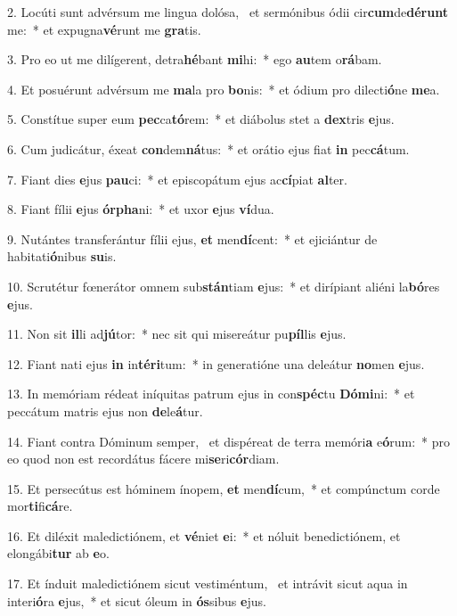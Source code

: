 2. Locúti sunt advérsum me lingua dolósa, \dag\  et sermónibus ódii cir\textbf{cum}de\textbf{dé}\textbf{runt} me:~*  et expugna\textbf{vé}runt me \textbf{gra}tis.\

3. Pro eo ut me dilígerent, detra\textbf{hé}bant \textbf{mi}hi:~*  ego \textbf{au}tem o\textbf{rá}bam.\

4. Et posuérunt advérsum me \textbf{ma}la pro \textbf{bo}nis:~*  et ódium pro dilecti\textbf{ó}ne \textbf{me}a.\

5. Constítue super eum \textbf{pec}ca\textbf{tó}rem:~*  et diábolus stet a \textbf{dex}tris \textbf{e}jus.\

6. Cum judicátur, éxeat \textbf{con}dem\textbf{ná}tus:~*  et orátio ejus fiat \textbf{in} pec\textbf{cá}tum.\

7. Fiant dies \textbf{e}jus \textbf{pau}ci:~*  et episcopátum ejus ac\textbf{cí}piat \textbf{al}ter.\

8. Fiant fílii \textbf{e}jus \textbf{ór}\textbf{pha}ni:~*  et uxor \textbf{e}jus \textbf{ví}dua.\

9. Nutántes transferántur fílii ejus, \textbf{et} men\textbf{dí}cent:~*  et ejiciántur de habitati\textbf{ó}nibus \textbf{su}is.\

10. Scrutétur fœnerátor omnem sub\textbf{stán}tiam \textbf{e}jus:~*  et dirípiant aliéni la\textbf{bó}res \textbf{e}jus.\

11. Non sit \textbf{il}li ad\textbf{jú}tor:~*  nec sit qui misereátur pu\textbf{píl}lis \textbf{e}jus.\

12. Fiant nati ejus \textbf{in} in\textbf{tér}\textbf{i}tum:~*  in generatióne una deleátur \textbf{no}men \textbf{e}jus.\

13. In memóriam rédeat iníquitas patrum ejus in con\textbf{spéc}tu \textbf{Dó}\textbf{mi}ni:~*  et peccátum matris ejus non \textbf{de}le\textbf{á}tur.\

14. Fiant contra Dóminum semper, \dag\  et dispéreat de terra memóri\textbf{a} e\textbf{ó}rum:~*  pro eo quod non est recordátus fácere mi\textbf{se}ri\textbf{cór}diam.\

15. Et persecútus est hóminem ínopem, \textbf{et} men\textbf{dí}cum,~*  et compúnctum corde mor\textbf{ti}fi\textbf{cá}re.\

16. Et diléxit maledictiónem, et \textbf{vé}niet \textbf{e}i:~*  et nóluit benedictiónem, et elongábi\textbf{tur} ab \textbf{e}o.\

17. Et índuit maledictiónem sicut vestiméntum, \dag\  et intrávit sicut aqua in interi\textbf{ó}ra \textbf{e}jus,~*  et sicut óleum in \textbf{ós}sibus \textbf{e}jus.\

